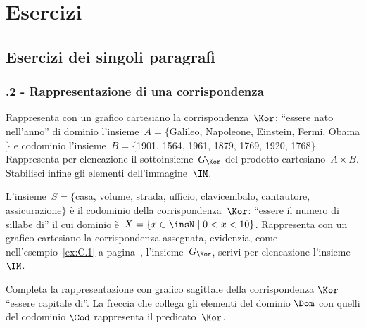 
\section{Esercizi}

\subsection{Esercizi dei singoli paragrafi}

\subsubsection*{\thechapter.2 - Rappresentazione di una corrispondenza}

\begin{esercizio}
\label{ese:C.1}
Rappresenta con un grafico cartesiano la corrispondenza~$\Kor$: ``essere nato nell'anno'' di dominio l'insieme~$A=\{$Galileo, Napoleone, Einstein, Fermi, Obama$\}$
e codominio l'insieme~$B=\{$1901, 1564, 1961, 1879, 1769, 1920, 1768$\}$. Rappresenta per elencazione il sottoinsieme~$G_\Kor$ del prodotto cartesiano~$A \times B$.
Stabilisci infine gli elementi dell'immagine~$\IM$.
\end{esercizio}

\begin{esercizio}
\label{ese:C.2}
L'insieme~$S=\{$casa, volume, strada, ufficio, clavicembalo, cantautore, assicurazione$\}$ è il codominio della corrispondenza~$\Kor$: ``essere il numero di sillabe di'' il cui dominio
è~$X=\{x \in\insN \mid  0<x<10\}$. Rappresenta con un grafico cartesiano la corrispondenza assegnata, evidenzia, come nell'esempio~\ref{ex:C.1} a pagina~\pageref{ex:C.1}, l'insieme~$G_\Kor$,
scrivi per elencazione l'insieme~$\IM$.
\end{esercizio}

\begin{esercizio}
\label{ese:C.3}
Completa la rappresentazione con grafico sagittale della corrispondenza $\Kor$ ``essere capitale di''. La freccia che collega gli elementi del dominio $\Dom$ con quelli del codominio $\Cod$ rappresenta
il predicato~$\Kor$.
\begin{center}
 
\end{center}

\end{esercizio}

